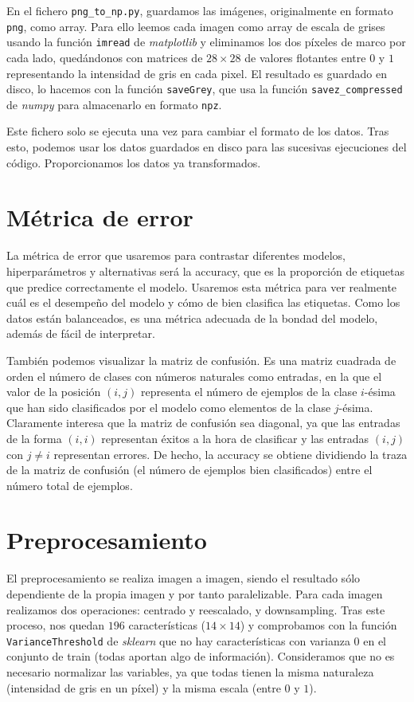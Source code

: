 \documentclass[a4]{article}
\begin{document}
En el fichero \texttt{png\_to\_np.py}, guardamos las imágenes,
originalmente en formato \texttt{png}, como array. Para ello leemos
cada imagen como array de escala de grises usando la función
\texttt{imread} de \textit{matplotlib} y eliminamos los dos píxeles de
marco por cada lado, quedándonos con matrices de $28 \times 28$ de
valores flotantes entre $0$ y $1$ representando la intensidad de gris
en cada pixel. El resultado es guardado en disco, lo hacemos con la
función \texttt{saveGrey}, que usa la función
\texttt{savez\_compressed} de \textit{numpy} para almacenarlo en
formato \texttt{npz}.

Este fichero solo se ejecuta una vez para cambiar el formato de los
datos. Tras esto, podemos usar los datos guardados en disco para las
sucesivas ejecuciones del código. Proporcionamos los datos ya
transformados.

\section{Métrica de error}

La métrica de error que usaremos para contrastar diferentes modelos,
hiperparámetros y alternativas será la accuracy, que es la proporción
de etiquetas que predice correctamente el modelo. Usaremos esta
métrica para ver realmente cuál es el desempeño del modelo y cómo de
bien clasifica las etiquetas. Como los datos están balanceados, es una
métrica adecuada de la bondad del modelo, además de fácil de
interpretar.

También podemos visualizar la matriz de confusión. Es una matriz
cuadrada de orden el número de clases con números naturales como
entradas, en la que el valor de la posición $(i, j)$ representa el
número de ejemplos de la clase $i$-ésima que han sido clasificados por
el modelo como elementos de la clase $j$-ésima. Claramente interesa
que la matriz de confusión sea diagonal, ya que las entradas de la
forma $(i, i)$ representan éxitos a la hora de clasificar y las
entradas $(i, j)$ con $j \neq i$ representan errores. De hecho, la
accuracy se obtiene dividiendo la traza de la matriz de confusión (el
número de ejemplos bien clasificados) entre el número total de
ejemplos.

\section{Preprocesamiento}

El preprocesamiento se realiza imagen a imagen, siendo el resultado
sólo dependiente de la propia imagen y por tanto paralelizable. Para
cada imagen realizamos dos operaciones: centrado y reescalado, y
downsampling. Tras este proceso, nos quedan $196$ características
($14 \times 14$) y comprobamos con la función
\texttt{VarianceThreshold} de \textit{sklearn} que no hay
características con varianza $0$ en el conjunto de train (todas
aportan algo de información). Consideramos que no es necesario
normalizar las variables, ya que todas tienen la misma naturaleza
(intensidad de gris en un píxel) y la misma escala (entre $0$ y $1$).
\end{document}
